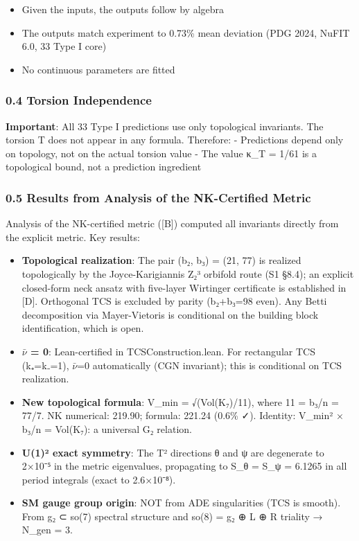 \documentclass[11pt,a4paper]{article}
\begin{document}
\begin{itemize}
\item
  Given the inputs, the outputs follow by algebra
\item
  The outputs match experiment to 0.73\% mean deviation (PDG 2024, NuFIT 6.0, 33 Type I core)
\item
  No continuous parameters are fitted
\end{itemize}

\subsubsection{0.4 Torsion Independence}\label{torsion-independence}

\textbf{Important}: All 33 Type I predictions use only topological invariants. The torsion T does not appear in any formula. Therefore:
- Predictions depend only on topology, not on the actual torsion value
- The value κ\_T = 1/61 is a topological bound, not a prediction ingredient

\subsubsection{0.5 Results from Analysis of the NK-Certified Metric}\label{results-from-analysis-of-the-nk-certified-metric}

Analysis of the NK-certified metric ([B]) computed all invariants directly from the explicit metric. Key results:

\begin{itemize}
\item
  \textbf{Topological realization}: The pair (b₂, b₃) = (21, 77) is realized topologically by the Joyce-Karigiannis Z₂³ orbifold route (S1 §8.4); an explicit closed-form neck ansatz with five-layer Wirtinger certificate is established in [D]. Orthogonal TCS is excluded by parity (b₂+b₃=98 even). Any Betti decomposition via Mayer-Vietoris is conditional on the building block identification, which is open.
\item
  \textbf{$\bar{\nu}$ = 0}: Lean-certified in TCSConstruction.lean. For rectangular TCS (k₊=k₋=1), $\bar{\nu}$=0 automatically (CGN invariant); this is conditional on TCS realization.
\item
  \textbf{New topological formula}: V\_min = √(Vol(K₇)/11), where 11 = b₃/n = 77/7. NK numerical: 219.90; formula: 221.24 (0.6\% ✓). Identity: V\_min² × b₃/n = Vol(K₇): a universal G₂ relation.
\item
  \textbf{U(1)² exact symmetry}: The T² directions θ and ψ are degenerate to 2×10⁻⁵ in the metric eigenvalues, propagating to S\_θ = S\_ψ = 6.1265 in all period integrals (exact to 2.6×10⁻⁸).
\item
  \textbf{SM gauge group origin}: NOT from ADE singularities (TCS is smooth). From g₂ ⊂ so(7) spectral structure and so(8) = g₂ ⊕ L ⊕ R triality → N\_gen = 3.
\end{itemize}
\end{document}
